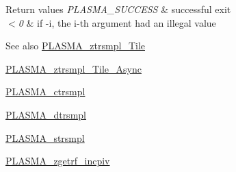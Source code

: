 \begin{DoxyRetVals}{Return values}
{\em P\+L\+A\+S\+M\+A\+\_\+\+S\+U\+C\+C\+E\+S\+S} & successful exit \\
\hline
{\em $<$0} & if -\/i, the i-\/th argument had an illegal value\\
\hline
\end{DoxyRetVals}
\begin{DoxySeeAlso}{See also}
\hyperlink{group__PLASMA__Complex64__t__Tile_gafa2cffe6bac9513274a7811ca683d1a0_gafa2cffe6bac9513274a7811ca683d1a0}{P\+L\+A\+S\+M\+A\+\_\+ztrsmpl\+\_\+\+Tile} 

\hyperlink{group__PLASMA__Complex64__t__Tile__Async_ga571f9103814a1dd4995a6094a293ef97_ga571f9103814a1dd4995a6094a293ef97}{P\+L\+A\+S\+M\+A\+\_\+ztrsmpl\+\_\+\+Tile\+\_\+\+Async} 

\hyperlink{group__PLASMA__Complex32__t_ga6f1a79fbd5420d08a1c0668c5f475f4f_ga6f1a79fbd5420d08a1c0668c5f475f4f}{P\+L\+A\+S\+M\+A\+\_\+ctrsmpl} 

\hyperlink{group__double_ga1ee42a61d4bf0294ed216add96e6ff37_ga1ee42a61d4bf0294ed216add96e6ff37}{P\+L\+A\+S\+M\+A\+\_\+dtrsmpl} 

\hyperlink{group__float_ga245da4f8540c426fde27a50eff39b64a_ga245da4f8540c426fde27a50eff39b64a}{P\+L\+A\+S\+M\+A\+\_\+strsmpl} 

\hyperlink{group__PLASMA__Complex64__t_ga085b5e62180512c7c603e72a9092ad8d_ga085b5e62180512c7c603e72a9092ad8d}{P\+L\+A\+S\+M\+A\+\_\+zgetrf\+\_\+incpiv} 
\end{DoxySeeAlso}
\hypertarget{group__PLASMA__Complex64__t_gadc613ba744f045286d0869bbbf6765ac_gadc613ba744f045286d0869bbbf6765ac}{}
